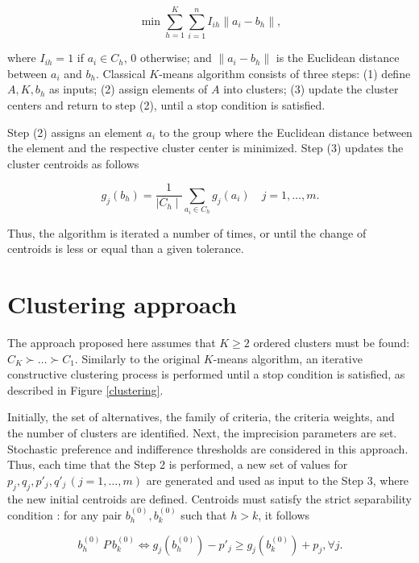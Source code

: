 \documentclass[]{elsarticle}
\theoremstyle{definition}
\begin{document}
\begin{equation}
\min \sum_{h=1}^{K} \sum_{i=1}^{n} I_{ih} \left\| a_i-b_h \right\|,
\end{equation}


\noindent
where  $I_{ih}=1$ if $a_i \in C_h$, $0$ otherwise; and $ \left\| a_i-b_h \right\|$ is the Euclidean distance between $a_i$ and $b_h$.  Classical $K$-means algorithm consists of three steps: (1) define $A, K, b_h$ as inputs; (2) assign elements of $A$ into clusters; (3) update the cluster centers and return to step (2), until a stop condition is satisfied.   

Step (2) assigns an element $a_i$ to the group where the Euclidean distance between the element and the respective cluster center is minimized.  Step (3) updates the cluster centroids as follows


\begin{equation}
g_j(b_h) = \frac{1}{\mid C_h \mid} \sum_{a_i \in C_h} g_j(a_i) \quad j=1,\ldots,m. \label{newcentroid}
\end{equation}

\noindent
Thus, the algorithm is iterated a number of times, or until the  change of centroids is less or equal than a given tolerance.


\section{Clustering approach}\label{methodology}

The approach proposed here assumes that $K\geq 2$ ordered clusters must be found: $C_K \succ \ldots \succ C_1$. Similarly to the original $K$-means algorithm, an iterative constructive clustering process is performed until a stop condition is satisfied, as described  in Figure \ref{clustering}.  

Initially, the set of alternatives, the family of criteria, the criteria weights, and the number of clusters are identified.  Next, the imprecision parameters are set. Stochastic preference and indifference thresholds are considered in this approach. Thus, each time that the Step 2 is performed, a new set of values for $p_j,q_j,p'_j,q'_j \,(j=1,\ldots,m)$ are generated and used as input to the Step 3, where the new initial centroids are defined. Centroids  must satisfy the strict separability condition \citep{roy2012}:  for any pair $b_h^{(0)}, b_k^{(0)}$ such that $h>k$, it follows 

\begin{equation}
b_h^{(0)} \,P\, b_k^{(0)} \Leftrightarrow g_j(b_h^{(0)})-p'_j \geq g_j(b_k^{(0)})+p_j, \forall j.
\end{equation}
\end{document}
